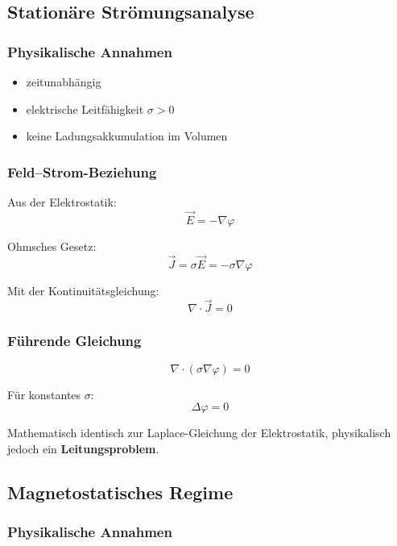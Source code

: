 \documentclass[a4paper]{article}
\newcommand{\imp}[1]{{\color{accent}\bfseries #1}}
\newcommand{\E}{\vec E}
\newcommand{\J}{\vec J}
\begin{document}
\subsection{Stationäre Strömungsanalyse}

\subsubsection{Physikalische Annahmen}

\begin{itemize}
  \item zeitunabhängig
  \item elektrische Leitfähigkeit $\sigma > 0$
  \item keine Ladungsakkumulation im Volumen
\end{itemize}

\subsubsection{Feld--Strom-Beziehung}

Aus der Elektrostatik:
\[
\E = -\nabla \varphi
\]

Ohmsches Gesetz:
\[
\J = \sigma \E = -\sigma \nabla \varphi
\]

Mit der Kontinuitätsgleichung:
\[
\nabla \cdot \J = 0
\]

\subsubsection{Führende Gleichung}

\[
\nabla \cdot (\sigma \nabla \varphi) = 0
\]

Für konstantes $\sigma$:
\[
\Delta \varphi = 0
\]

\begin{merke}
Mathematisch identisch zur Laplace-Gleichung der Elektrostatik,
physikalisch jedoch ein \imp{Leitungsproblem}.
\end{merke}

\subsection{Magnetostatisches Regime}

\subsubsection{Physikalische Annahmen}
\end{document}

